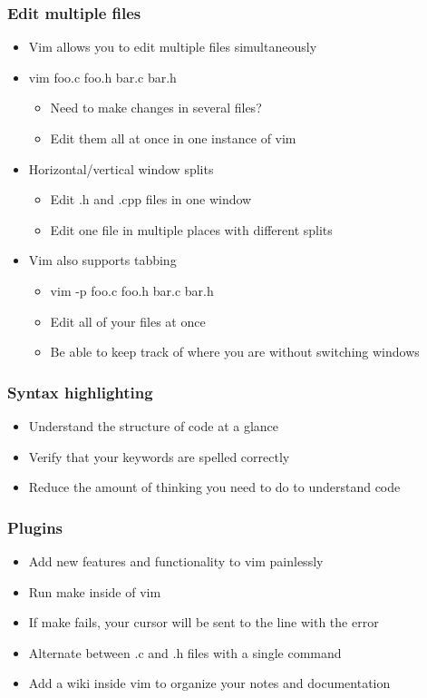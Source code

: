 \documentclass{beamer}
\begin{document}
\begin{frame}
    \frametitle{Edit multiple files}
    \begin{itemize}
	\item Vim allows you to edit multiple files simultaneously
	\item vim foo.c foo.h bar.c bar.h
	\begin{itemize}
	    \item Need to make changes in several files?
	    \item Edit them all at once in one instance of vim
	\end{itemize}
	\item Horizontal/vertical window splits
	\begin{itemize}
	    \item Edit .h and .cpp files in one window
	    \item Edit one file in multiple places with different splits
	\end{itemize}
	\item Vim also supports tabbing
	\begin{itemize}
	    \item vim -p foo.c foo.h bar.c bar.h
	    \item Edit all of your files at once
	    \item Be able to keep track of where you are without switching windows
	\end{itemize}
    \end{itemize}
\end{frame}

\begin{frame}
    \frametitle{Syntax highlighting}
    \begin{itemize}
	\item Understand the structure of code at a glance
	\item Verify that your keywords are spelled correctly
	\item Reduce the amount of thinking you need to do to understand code
    \end{itemize}
\end{frame}

\begin{frame}
    \frametitle{Plugins}
    \begin{itemize}
	\item Add new features and functionality to vim painlessly
	\item Run make inside of vim
	\item If make fails, your cursor will be sent to the line 
	    with the error
	\item Alternate between .c and .h files with a single command
	\item Add a wiki inside vim to organize your notes and 
	    documentation
    \end{itemize}
\end{frame}
\end{document}
